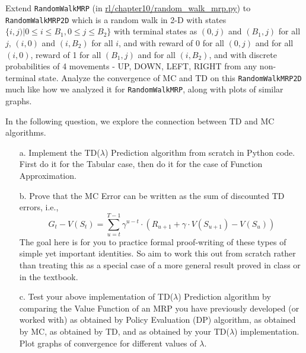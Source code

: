 \documentclass[12pt]{exam}
\begin{document}
\begin{questions}
\question Extend \lstinline{RandomWalkMRP} (in \href{https://github.com/TikhonJelvis/RL-book/blob/master/rl/chapter10/random_walk_mrp.py}{rl\//chapter10\//random\_walk\_mrp.py}) to \lstinline{RandomWalkMRP2D} which is a random walk in 2-D with states $\{i, j) | 0 \leq i \leq B_1, 0 \leq j \leq B_2\}$ with terminal states as $(0, j)$ and $(B_1, j)$ for all $j$, $(i, 0)$ and $(i, B_2)$ for all $i$, and with reward of 0 for all $(0, j)$ and for all $(i, 0)$, reward of 1 for all $(B_1, j)$ and for all $(i, B_2)$, and with discrete probabilities of 4 movements - UP, DOWN, LEFT, RIGHT from any non-terminal state. Analyze the convergence of MC and TD on this \lstinline{RandomWalkMRP2D} much like how we analyzed it for \lstinline{RandomWalkMRP}, along with plots of similar graphs.

\question In the following question, we explore the connection between TD and MC algorithms. 
\begin{enumerate} 
	\item[a.] Implement the TD($\lambda$) Prediction algorithm from scratch in Python code. First do it for the Tabular case, then do it for the case of Function Approximation. 
	\item[b.] Prove that the MC Error can be written as the sum of discounted TD errors, i.e.,
$$G_t - V(S_t) = \sum_{u=t}^{T-1} \gamma^{u-t} \cdot (R_{u+1} + \gamma \cdot V(S_{u+1}) - V(S_u))$$
The goal here is for you to practice formal proof-writing of these types of simple yet important identities. So aim to work this out from scratch rather than treating this as a special case of a more general result proved in class or in the textbook.
	\item[c.] Test your above implementation of TD($\lambda$) Prediction algorithm by comparing the Value Function of an MRP you have previously developed (or worked with) as obtained by Policy Evaluation (DP) algorithm, as obtained by MC, as obtained by TD, and as obtained by your TD($\lambda$) implementation. Plot graphs of convergence for different values of $\lambda$.
	\end{enumerate}
\end{questions}
\end{document}

